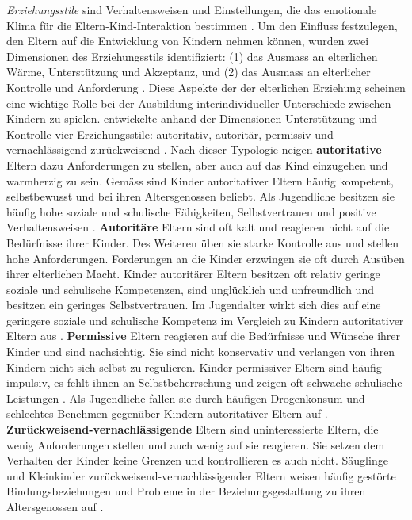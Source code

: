 \textit{Erziehungsstile} sind Verhaltensweisen und Einstellungen, die das emotionale Klima für die Eltern-Kind-Interaktion bestimmen \cite[S.~649]{Siegler2008}. Um den Einfluss festzulegen, den Eltern auf die Entwicklung von Kindern nehmen können, wurden zwei Dimensionen des Erziehungsstils identifiziert: (1) das Ausmass an elterlichen Wärme, Unterstützung und Akzeptanz, und (2) das Ausmass an elterlicher Kontrolle und Anforderung \cite{Maccoby1983}. Diese Aspekte der der elterlichen Erziehung scheinen eine wichtige Rolle bei der Ausbildung interindividueller Unterschiede zwischen Kindern zu spielen.  entwickelte anhand der Dimensionen Unterstützung und Kontrolle vier Erziehungsstile: autoritativ, autoritär, permissiv und vernachlässigend-zurückweisend \cite{Baumrind1991}. Nach dieser Typologie neigen \textbf{autoritative} Eltern dazu Anforderungen zu stellen, aber auch auf das Kind einzugehen und warmherzig zu sein. Gemäss  sind Kinder autoritativer Eltern häufig kompetent, selbstbewusst und bei ihren Altersgenossen beliebt. Als Jugendliche besitzen sie häufig hohe soziale und schulische Fähigkeiten, Selbstvertrauen und positive Verhaltensweisen \cite{Lamborn1991}. \textbf{Autoritäre} Eltern sind oft kalt und reagieren nicht auf die Bedürfnisse ihrer Kinder. Des Weiteren üben sie starke Kontrolle aus und stellen hohe Anforderungen. Forderungen an die Kinder erzwingen sie oft durch Ausüben ihrer elterlichen Macht. Kinder autoritärer Eltern besitzen oft relativ geringe soziale und schulische Kompetenzen, sind unglücklich und unfreundlich und besitzen ein geringes Selbstvertrauen. Im Jugendalter wirkt sich dies auf eine geringere soziale und schulische Kompetenz im Vergleich zu Kindern autoritativer Eltern aus \cite{Baumrind1991, Lamborn1991}.  \textbf{Permissive} Eltern reagieren auf die Bedürfnisse und Wünsche ihrer Kinder und sind nachsichtig. Sie sind nicht konservativ und verlangen von ihren Kindern nicht sich selbst zu regulieren. Kinder permissiver Eltern sind häufig impulsiv, es fehlt ihnen an Selbstbeherrschung und zeigen oft schwache schulische Leistungen \cite{Baumrind1991}. Als Jugendliche fallen sie durch häufigen Drogenkonsum und schlechtes Benehmen gegenüber Kindern autoritativer Eltern auf \cite{Lamborn1991}. \textbf{Zurückweisend-vernachlässigende} Eltern sind uninteressierte Eltern, die wenig Anforderungen stellen und auch wenig auf sie reagieren. Sie setzen dem Verhalten der Kinder keine Grenzen und kontrollieren es auch nicht. Säuglinge und Kleinkinder zurückweisend-vernachlässigender Eltern weisen häufig gestörte Bindungsbeziehungen und Probleme in der Beziehungsgestaltung zu ihren Altersgenossen auf \cite{Parke1998}.


